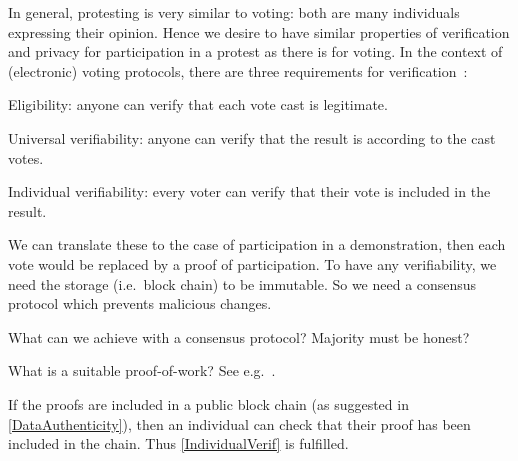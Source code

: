 In general, protesting is very similar to voting: both are many individuals 
expressing their opinion.
Hence we desire to have similar properties of verification and privacy for 
participation in a protest as there is for voting.
In the context of (electronic) voting protocols, there are three requirements 
for verification~\cite{VerifyingPrivacyPropertiesOfVotingProtocols}:
\begin{frame}
\begin{requirements}[V]
\item\label{EligibilityVerif} Eligibility: anyone can verify that each vote 
  cast is legitimate.
\item\label{UniversalVerif} Universal verifiability: anyone can verify that the 
  result is according to the cast votes.
\item\label{IndividualVerif} Individual verifiability: every voter can verify 
  that their vote is included in the result.
\end{requirements}
\end{frame}
We can translate these to the case of participation in a demonstration, then 
each vote would be replaced by a proof of participation.
To have any verifiability, we need the storage (i.e.\ block chain) to be 
immutable.
So we need a consensus protocol which prevents malicious changes.

\begin{frame}

  \begin{question}
    What can we achieve with a consensus protocol?
    Majority must be honest?
  \end{question}
  \begin{question}
    What is a suitable proof-of-work?
    See e.g.~\cite{FairProofOfWork}.
  \end{question}
\end{frame}

If the proofs are included in a public block chain (as suggested in 
\cref{DataAuthenticity}), then an individual can check that their proof has 
been included in the chain.
Thus \cref{IndividualVerif} is fulfilled.

